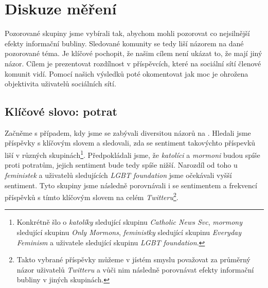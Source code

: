 \documentclass[12pt, a4paper]{article}
\numberwithin{equation}{section} 	%
\begin{document}
\newpage
\section{Diskuze měření}
\noindent Pozorované skupiny jsme vybírali tak, abychom mohli pozorovat co nejsilnější efekty informační bubliny. Sledované komunity se tedy liší názorem na dané pozorované téma.  Je klíčové pochopit, že našim cílem není ukázat to, že mají jiný názor. Cílem je prezentovat rozdílnost v příspěvcích, které na sociální sítí členové komunit vidí. Pomocí našich výsledků poté okomentovat jak moc je ohrožena objektivita uživatelů sociálních sítí.

\subsection{Klíčové slovo: potrat}\label{subsec:abortion}
\noindent Začněme s případem, kdy jsme se zabývali diversitou názorů na \textit{}. Hledali jsme příspěvky s klíčovým slovem \textit{} a sledovali, zda se sentiment takovýchto příspevků liší v různých skupinách\footnote{Konkrétně šlo o \textit{katolíky} sledující skupinu \textit{Catholic News Svc}, \textit{mormony} sledující skupinu \textit{Only Mormons}, \textit{feministky} sledující skupinu \textit{Everyday Feminism} a uživatele sledující skupinu \textit{LGBT foundation}.}. Předpokládali jsme, že \textit{katolíci} a \textit{mormoni} budou spíše proti potratům, jejich sentiment bude tedy spíše nižší. Narozdíl od toho u \textit{feministek} a uživatelů sledujících \textit{LGBT foundation} jsme očekávali vyšší sentiment. Tyto skupiny jsme následně porovnávali i se sentimentem a frekvencí příspěvků s tímto klíčovým slovem na celém \textit{Twitteru}\footnote{Takto vybrané příspěvky můžeme v jístém smyslu považovat za průměrný názor uživatelů \textit{Twitteru} a vůči nim následně porovnávat efekty informační bubliny v jiných skupinách.}.
\end{document}
